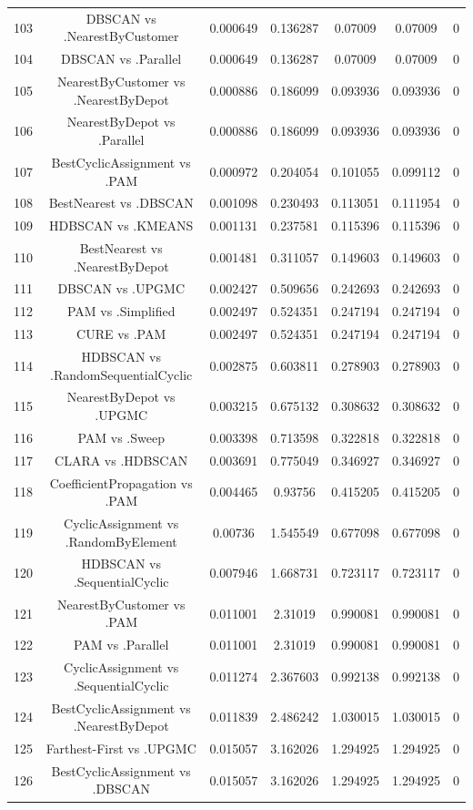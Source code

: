 \documentclass[a4paper,10pt]{article}
\begin{document}
\begin{landscape}
\begin{table}[!htp]
\begin{tabular}{ccccccc}
103&DBSCAN vs .NearestByCustomer&0.000649&0.136287&0.07009&0.07009&0\\
104&DBSCAN vs .Parallel&0.000649&0.136287&0.07009&0.07009&0\\
105&NearestByCustomer vs .NearestByDepot&0.000886&0.186099&0.093936&0.093936&0\\
106&NearestByDepot vs .Parallel&0.000886&0.186099&0.093936&0.093936&0\\
107&BestCyclicAssignment vs .PAM&0.000972&0.204054&0.101055&0.099112&0\\
108&BestNearest vs .DBSCAN&0.001098&0.230493&0.113051&0.111954&0\\
109&HDBSCAN vs .KMEANS&0.001131&0.237581&0.115396&0.115396&0\\
110&BestNearest vs .NearestByDepot&0.001481&0.311057&0.149603&0.149603&0\\
111&DBSCAN vs .UPGMC&0.002427&0.509656&0.242693&0.242693&0\\
112&PAM vs .Simplified&0.002497&0.524351&0.247194&0.247194&0\\
113&CURE vs .PAM&0.002497&0.524351&0.247194&0.247194&0\\
114&HDBSCAN vs .RandomSequentialCyclic&0.002875&0.603811&0.278903&0.278903&0\\
115&NearestByDepot vs .UPGMC&0.003215&0.675132&0.308632&0.308632&0\\
116&PAM vs .Sweep&0.003398&0.713598&0.322818&0.322818&0\\
117&CLARA vs .HDBSCAN&0.003691&0.775049&0.346927&0.346927&0\\
118&CoefficientPropagation vs .PAM&0.004465&0.93756&0.415205&0.415205&0\\
119&CyclicAssignment vs .RandomByElement&0.00736&1.545549&0.677098&0.677098&0\\
120&HDBSCAN vs .SequentialCyclic&0.007946&1.668731&0.723117&0.723117&0\\
121&NearestByCustomer vs .PAM&0.011001&2.31019&0.990081&0.990081&0\\
122&PAM vs .Parallel&0.011001&2.31019&0.990081&0.990081&0\\
123&CyclicAssignment vs .SequentialCyclic&0.011274&2.367603&0.992138&0.992138&0\\
124&BestCyclicAssignment vs .NearestByDepot&0.011839&2.486242&1.030015&1.030015&0\\
125&Farthest-First vs .UPGMC&0.015057&3.162026&1.294925&1.294925&0\\
126&BestCyclicAssignment vs .DBSCAN&0.015057&3.162026&1.294925&1.294925&0\\

\end{tabular}
\end{table}
\end{landscape}
\end{document}
